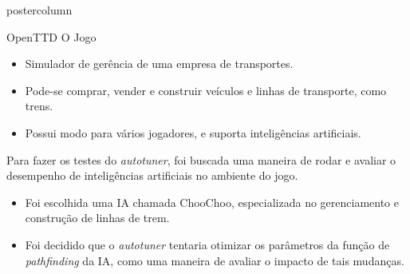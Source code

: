 \documentclass[final]{beamer}
\newlength{\columnheight}
\begin{document}
\begin{frame}
\begin{columns}
    \begin{column}{.5\textwidth}
      \begin{beamercolorbox}[center,wd=\textwidth]{postercolumn}
        \begin{minipage}[T]{.95\textwidth} %
          \parbox[t][\columnheight]{\textwidth}{ %
            
            \vspace*{0.8cm}
            
            \begin{block}{OpenTTD}
                O Jogo
                \begin{itemize}
                  \item Simulador de gerência de uma empresa de transportes.
                  \item Pode-se comprar, vender e construir veículos e linhas de transporte, como trens.
                  \item Possui modo para vários jogadores, e suporta inteligências artificiais.
                \end{itemize}
                
                \vspace*{0.5cm}
                Para fazer os testes do \textit{autotuner}, foi buscada uma maneira de rodar e avaliar o desempenho de inteligências artificiais no ambiente do jogo.
                \begin{itemize}
                  \item Foi escolhida uma IA chamada ChooChoo, especializada no gerenciamento e construção de linhas de trem.
                  \item Foi decidido que o \textit{autotuner} tentaria otimizar os parâmetros da função de \textit{pathfinding} da IA, como uma maneira de avaliar o impacto de tais mudanças.
                \end{itemize}  
                         
                \vspace*{0,2cm}
                

\end{block}}
\end{minipage}
\end{beamercolorbox}
\end{column}
\end{columns}
\end{frame}
\end{document}
